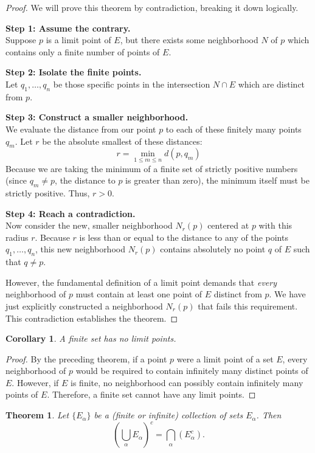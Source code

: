\documentclass{article}
\theoremstyle{mythm}
\newtheorem{theorem}{Theorem}[section]
\newtheorem{corollary}{Corollary}[theorem]
\begin{document}
\begin{proof}
We will prove this theorem by contradiction, breaking it down logically.

\textbf{Step 1: Assume the contrary.} \\
Suppose $p$ is a limit point of $E$, but there exists some neighborhood $N$ of $p$ which contains only a finite number of points of $E$.

\textbf{Step 2: Isolate the finite points.} \\
Let $q_1, \dots, q_n$ be those specific points in the intersection $N \cap E$ which are distinct from $p$.

\textbf{Step 3: Construct a smaller neighborhood.} \\
We evaluate the distance from our point $p$ to each of these finitely many points $q_m$. Let $r$ be the absolute smallest of these distances:
\[ r = \min_{1 \le m \le n} d(p, q_m) \]
Because we are taking the minimum of a finite set of strictly positive numbers (since $q_m \neq p$, the distance to $p$ is greater than zero), the minimum itself must be strictly positive. Thus, $r > 0$.

\textbf{Step 4: Reach a contradiction.} \\
Now consider the new, smaller neighborhood $N_r(p)$ centered at $p$ with this radius $r$. Because $r$ is less than or equal to the distance to any of the points $q_1, \dots, q_n$, this new neighborhood $N_r(p)$ contains absolutely no point $q$ of $E$ such that $q \neq p$.
    
However, the fundamental definition of a limit point demands that \textit{every} neighborhood of $p$ must contain at least one point of $E$ distinct from $p$. We have just explicitly constructed a neighborhood $N_r(p)$ that fails this requirement. This contradiction establishes the theorem.
\end{proof}
\begin{corollary}
A finite set has no limit points.
\end{corollary}

\begin{proof}
By the preceding theorem, if a point $p$ were a limit point of a set $E$, every neighborhood of $p$ would be required to contain infinitely many distinct points of $E$. However, if $E$ is finite, no neighborhood can possibly contain infinitely many points of $E$. Therefore, a finite set cannot have any limit points.
\end{proof}
\begin{theorem}
Let $\{E_\alpha\}$ be a (finite or infinite) collection of sets $E_\alpha$. Then
\[ \left(\bigcup_\alpha E_\alpha\right)^c = \bigcap_\alpha \left(E_\alpha^c\right). \] 
\end{theorem}
\end{document}
